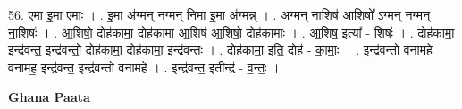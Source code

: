 \documentclass[17pt]{extarticle}
\begin{document}
56. एमा इ॒मा एमाः । . इ॒मा अ॑ग्मन् नग्मन् नि॒मा इ॒मा अ॑ग्मन्न् । . अ॒ग्म॒न् ना॒शिष॑ आ॒शिषो᳚ ऽग्मन् नग्मन् ना॒शिषः॑ । . आ॒शिषो॒ दोह॑कामा॒ दोह॑कामा आ॒शिष॑ आ॒शिषो॒ दोह॑कामाः । . आ॒शिष॒ इत्या᳚ - शिषः॑ । . दोह॑कामा॒ इन्द्र॑वन्त॒ इन्द्र॑वन्तो॒ दोह॑कामा॒ दोह॑कामा॒ इन्द्र॑वन्तः । . दोह॑कामा॒ इति॒ दोह॑ - का॒माः॒ । . इन्द्र॑वन्तो वनामहे वनामह॒ इन्द्र॑वन्त॒ इन्द्र॑वन्तो वनामहे । . इन्द्र॑वन्त॒ इतीन्द्र॑ - व॒न्तः॒ । \newline

\textbf{Ghana Paata } \newline
\end{document}
